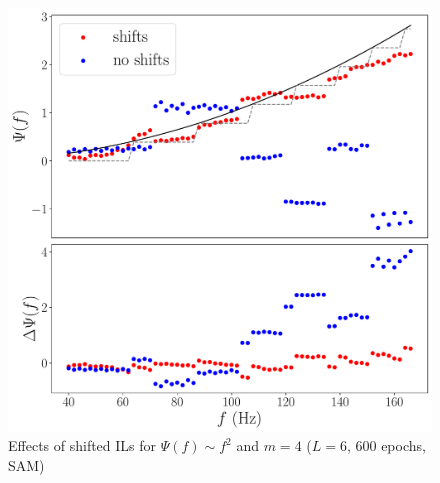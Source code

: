 \documentclass{beamer}
\begin{document}
\begin{frame}
\begin{columns}
\begin{column}{0.5\textwidth}
\begin{figure}
\includegraphics[width=\textwidth]{im/phase_shift_comp_quadratic_m4}
\caption{Effects of shifted ILs for $\Psi(f) \sim f^2$ and $m=4$ ($L=6$, 600 epochs, SAM)}
\end{figure}
\end{column}
\end{columns}
\end{frame}
\end{document}
